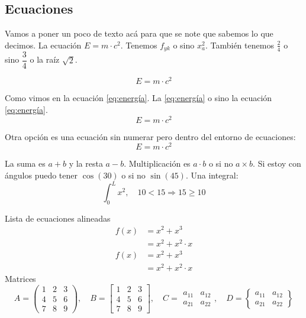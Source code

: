 \subsection{Ecuaciones}
Vamos a poner un poco de texto acá para que se note que sabemos lo que decimos. La ecuación $ E=m\cdot c^2 $. Tenemos $ f_{yk} $ o sino $ x_{a}^{2} $. También tenemos $ \frac{2}{4} $ o sino $ \dfrac{3}{4} $ o la raíz $ \sqrt{2} $.

$$ E=m\cdot c^2 $$

Como vimos en la ecuación \ref{eq:energía}. La \autoref{eq:energía} o sino la ecuación \eqref{eq:energía}.
\begin{equation} \label{eq:energía}
	E=m\cdot c^2
\end{equation}

Otra opción es una ecuación sin numerar pero dentro del entorno de ecuaciones:
\begin{equation*} \label{eq:energía2}
	E=m\cdot c^2
\end{equation*}

La suma es $ a+b $ y la resta $ a-b $. Multiplicación es $ a\cdot b$ o si no $ a \times b $. Si estoy con ángulos puedo tener $ \cos(30) $ o si no $ \sin(45) $. Una integral:
$$ \int_0^L x^2, \quad 10<15 \Rightarrow 15 \geq 10$$

Lista de ecuaciones alineadas
\begin{align}
	f(x) &= x^2+x^3			\\
	&= x^2+x^2\cdot x 
\end{align}
\begin{align*}
	f(x) &= x^2+x^3			\\
	&= x^2+x^2\cdot x 
\end{align*}
Matrices
\begin{equation*}
	A = 
	\begin{pmatrix}
		1 & 2 & 3 \\
		4 & 5 & 6 \\
		7 & 8 & 9
	\end{pmatrix}, \quad
	B = 
	\begin{bmatrix}
		1 & 2 & 3 \\
		4 & 5 & 6 \\
		7 & 8 & 9
	\end{bmatrix}, \quad
	C =
	\begin{matrix} 
		a_{11} & a_{12}  \\
		a_{21} & a_{22}  
	\end{matrix}, \quad
	D = 
	\begin{Bmatrix} 
		a_{11} & a_{12}  \\
		a_{21} & a_{22}  
	\end{Bmatrix} 
\end{equation*}
